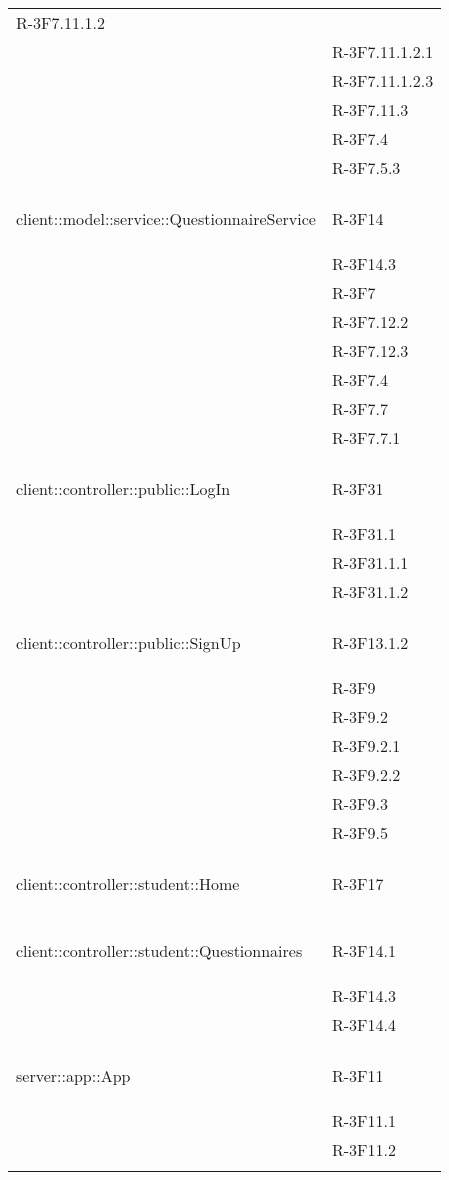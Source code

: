 \begin{longtable}{l p{3cm}}
R-3F7.11.1.2 \tabularnewline &

R-3F7.11.1.2.1 \tabularnewline &

R-3F7.11.1.2.3 \tabularnewline &

R-3F7.11.3 \tabularnewline &

R-3F7.4 \tabularnewline &

R-3F7.5.3 \tabularnewline &\tabularnewline
\midrule
\hypertarget{client::model::service::QuestionnaireService}{client::model::service::QuestionnaireService} & R-3F14 \tabularnewline &

R-3F14.3 \tabularnewline &

R-3F7 \tabularnewline &

R-3F7.12.2 \tabularnewline &

R-3F7.12.3 \tabularnewline &

R-3F7.4 \tabularnewline &

R-3F7.7 \tabularnewline &

R-3F7.7.1 \tabularnewline &\tabularnewline
\midrule
\hypertarget{client::controller::public::LogIn}{client::controller::public::LogIn} & R-3F31 \tabularnewline &

R-3F31.1 \tabularnewline &

R-3F31.1.1 \tabularnewline &

R-3F31.1.2 \tabularnewline &\tabularnewline
\midrule
\hypertarget{client::controller::public::SignUp}{client::controller::public::SignUp} & R-3F13.1.2 \tabularnewline &

R-3F9 \tabularnewline &

R-3F9.2 \tabularnewline &

R-3F9.2.1 \tabularnewline &

R-3F9.2.2 \tabularnewline &

R-3F9.3 \tabularnewline &

R-3F9.5 \tabularnewline &\tabularnewline
\midrule
\hypertarget{client::controller::student::Home}{client::controller::student::Home} & R-3F17 \tabularnewline &\tabularnewline
\midrule
\hypertarget{client::controller::student::Questionnaires}{client::controller::student::Questionnaires} & R-3F14.1 \tabularnewline &

R-3F14.3 \tabularnewline &

R-3F14.4 \tabularnewline &\tabularnewline
\midrule
\hypertarget{server::app::App}{server::app::App} & R-3F11 \tabularnewline &

R-3F11.1 \tabularnewline &

R-3F11.2 \tabularnewline &


\end{longtable}
